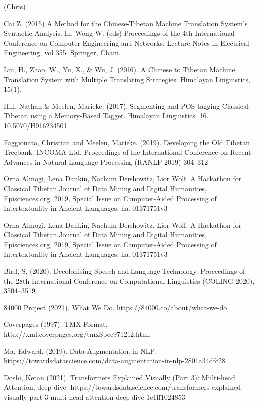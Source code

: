 \documentclass[letterpaper, 12 pt, conference]{ieeeconf}  %
\begin{document}
(Chris)
\begin{thebibliography}{99}



 Cai Z. (2015) A Method for the Chinese-Tibetan Machine Translation System’s Syntactic Analysis. In: Wong W. (eds) Proceedings of the 4th International Conference on Computer Engineering and Networks. Lecture Notes in Electrical Engineering, vol 355. Springer, Cham. 

 Liu, H., Zhao, W., Yu, X., & Wu, J. (2016). A Chinese to Tibetan Machine Translation System with Multiple Translating Strategies. Himalayan Linguistics, 15(1).

 Hill, Nathan & Meelen, Marieke. (2017). Segmenting and POS tagging Classical Tibetan using a Memory-Based Tagger. Himalayan Linguistics. 16. 10.5070/H916234501. 

 Faggionato, Christian  and Meelen, Marieke. (2019). Developing the Old Tibetan Treebank. INCOMA Ltd. Proceedings of the International Conference on Recent Advances in Natural Language Processing (RANLP 2019) 304--312


 Orna Almogi, Lena Dankin, Nachum Dershowitz, Lior Wolf. A Hackathon for Classical Tibetan.Journal of Data Mining and Digital Humanities, Episciences.org, 2019, Special Issue on Computer-Aided Processing of Intertextuality in Ancient Languages. hal-01371751v3

 Orna Almogi, Lena Dankin, Nachum Dershowitz, Lior Wolf. A Hackathon for Classical Tibetan.Journal of Data Mining and Digital Humanities, Episciences.org, 2019, Special Issue on Computer-Aided Processing of Intertextuality in Ancient Languages. hal-01371751v3


 Bird, S. (2020). Decolonising Speech and Language Technology. Proceedings of the 28th International Conference on Computational Linguistics (COLING 2020), 3504–3519.


 84000 Project (2021). What We Do. https://84000.co/about/what-we-do


 Coverpages (1997). TMX Format. http://xml.coverpages.org/tmxSpec971212.html

 Ma, Edward. (2019). Data Augmentation in NLP. https://towardsdatascience.com/data-augmentation-in-nlp-2801a34dfc28

 Doshi, Ketan (2021). Transformers Explained Visually (Part 3): Multi-head Attention, deep dive. https://towardsdatascience.com/transformers-explained-visually-part-3-multi-head-attention-deep-dive-1c1ff1024853


\end{thebibliography}
\end{document}
